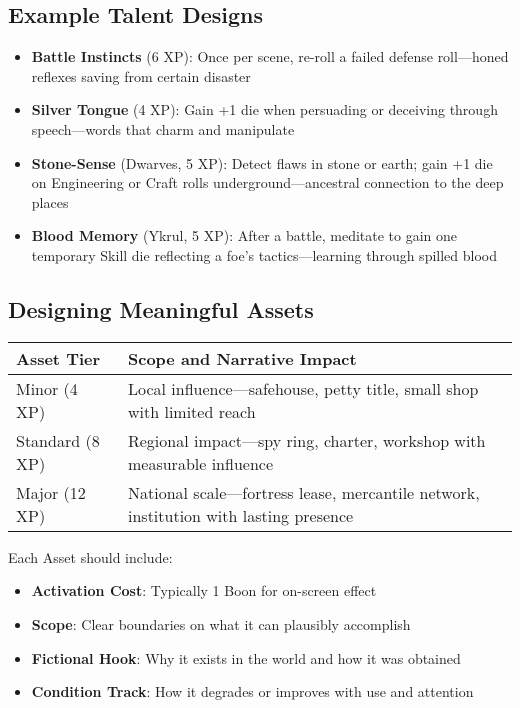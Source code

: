 \subsection*{Example Talent Designs}

\begin{itemize}
    \item \textbf{Battle Instincts} (6 XP): Once per scene, re-roll a failed defense roll—honed reflexes saving from certain disaster
    \item \textbf{Silver Tongue} (4 XP): Gain +1 die when persuading or deceiving through speech—words that charm and manipulate
    \item \textbf{Stone-Sense} (Dwarves, 5 XP): Detect flaws in stone or earth; gain +1 die on Engineering or Craft rolls underground—ancestral connection to the deep places
    \item \textbf{Blood Memory} (Ykrul, 5 XP): After a battle, meditate to gain one temporary Skill die reflecting a foe's tactics—learning through spilled blood
\end{itemize}

\subsection*{Designing Meaningful Assets}

\begin{fatebox}
\begin{tabularx}{\textwidth}{lX}
\toprule
\textbf{Asset Tier} & \textbf{Scope and Narrative Impact} \\
\midrule
Minor (4 XP) & Local influence—safehouse, petty title, small shop with limited reach \\
Standard (8 XP) & Regional impact—spy ring, charter, workshop with measurable influence \\
Major (12 XP) & National scale—fortress lease, mercantile network, institution with lasting presence \\
\bottomrule
\end{tabularx}
\end{fatebox}

Each Asset should include:
\begin{itemize}
    \item \textbf{Activation Cost}: Typically 1 Boon for on-screen effect
    \item \textbf{Scope}: Clear boundaries on what it can plausibly accomplish
    \item \textbf{Fictional Hook}: Why it exists in the world and how it was obtained
    \item \textbf{Condition Track}: How it degrades or improves with use and attention
\end{itemize}

